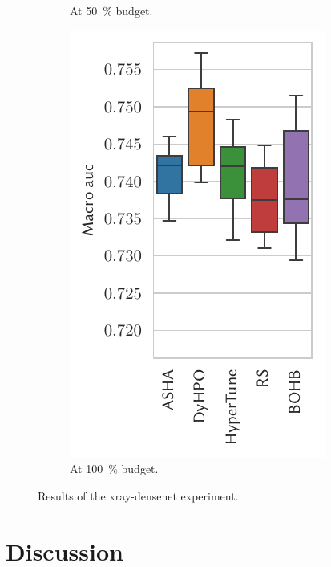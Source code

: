 \begin{figure}[H]
\begin{subfigure}{.26\textwidth}
        \caption{At \SI{50}{\percent} budget.}%
    \end{subfigure}%
    \begin{subfigure}{.26\textwidth}
        \includegraphics[height=\plotheight]{img/real_exp/xray_densenet_boxplot_full.pdf}%
        \caption{At \SI{100}{\percent} budget.}%
    \end{subfigure}%
\caption{Results of the xray-densenet experiment.}
\label{fig:densenet_chestx}
\end{figure}


\section{Discussion} %





